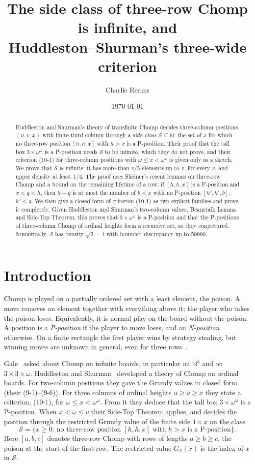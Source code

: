 \documentclass[11pt]{amsart}
\title[The side class of three-row Chomp]{The side class of three-row Chomp is infinite, and\\ Huddleston--Shurman's three-wide criterion}
\author{Charlie Reams}
\date{\today}
\theoremstyle{definition}
\theoremstyle{remark}
\newcommand{\Sc}{\mathcal{S}}
\newcommand{\GS}{G_{\Sc}}
\begin{document}
\begin{abstract}
Huddleston and Shurman's theory of transfinite Chomp decides three-column positions
$(u,v,x)$ with finite third column through a \emph{side class} $\Sc\subseteq\mathbb N$: the set of
$x$ for which no three-row position $[h,h,x]$ with $h>x$ is a P-position. Their proof that
the tall box $3\times\omega^\omega$ is a P-position needs $\Sc$ to be infinite, which they do
not prove, and their criterion (10-1) for three-column positions with $\omega\le x<\omega^\omega$ is
given only as a sketch. We prove that $\Sc$ is infinite: it has more than $v/5$ elements up
to $v$, for every $v$, and upper density at least $1/4$. The proof uses Sheiner's recent lemmas
on three-row Chomp and a bound on the remaining lifetime of a row: if $[h,h,x]$ is a P-position
and $x<q<h$, then $h-q$ is at most the number of $b<x$ with no P-position $[h',h',b]$,
$h'\le q$. We then give a closed form of
criterion (10-1) as two explicit families and prove it completely. Given Huddleston and
Shurman's two-column values, Beanstalk Lemma and Side-Top Theorem, this proves that
$3\times\omega^\omega$ is a P-position and that the P-positions of three-column Chomp of
ordinal heights form a recursive set, as they conjectured. Numerically, $\Sc$ has density
$\sqrt2-1$ with bounded discrepancy up to $50000$.
\end{abstract}
\maketitle

\section{Introduction}

Chomp is played on a partially ordered set with a least element, the poison. A move removes
an element together with everything above it; the player who takes the poison loses.
Equivalently, it is normal play on the board without the poison. A position is a
\emph{P-position} if the player to move loses, and an \emph{N-position} otherwise. On a
finite rectangle the first player wins by strategy stealing, but winning moves are unknown in
general, even for three rows~\cite{BHMS,Z}.

Gale~\cite{Gale} asked about Chomp on infinite boards, in particular on $\mathbb N^3$ and on
$3\times3\times\omega$. Huddleston and Shurman~\cite{HS} developed a theory of Chomp on
ordinal boards. For two-column positions they gave the Grundy values in closed form
(their (9-1)--(9-6)). For three columns of ordinal heights $u\ge v\ge x$ they state a
criterion, (10-1), for $\omega\le x<\omega^\omega$. From it they deduce that the tall box
$3\times\omega^\omega$ is a P-position. When $x<\omega\le v$ their Side-Top Theorem applies,
and decides the position through the restricted Grundy value of the finite side $1\times x$
on the class
\[
\Sc=\{x\ge 0:\ \text{no three-row position }[h,h,x]\text{ with }h>x\text{ is a P-position}\}.
\]
Here $[a,b,c]$ denotes three-row Chomp with rows of lengths $a\ge b\ge c$, the poison at the
start of the first row. The restricted value $\GS(x)$ is the index of $x$ in $\Sc$.
\end{document}
